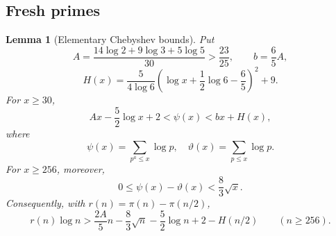 \documentclass[11pt]{article}
\numberwithin{equation}{section}
\newtheorem{lemma}[theorem]{Lemma}
\theoremstyle{definition}\newtheorem{definition}[theorem]{Definition}
\theoremstyle{remark}\newtheorem{remark}[theorem]{Remark}
\begin{document}
\subsection{Fresh primes}\label{arith:sec:elementary-primes}

\begin{lemma}[Elementary Chebyshev bounds]
\label{arith:lem:elementary-chebyshev}
Put
\[
 A=\frac{14\log2+9\log3+5\log5}{30}>\frac{23}{25},
 \qquad b=\frac65A,
\]
\[
 H(x)=\frac5{4\log6}
       \left(\log x+\frac12\log6-\frac65\right)^2+9.
\]
For $x\ge30$,
\[
 Ax-\frac52\log x+2<\psi(x)< bx+H(x),
\]
where
\[
 \psi(x)=\sum_{p^a\le x}\log p,\quad \vartheta(x)=\sum_{p\le x}\log p.
\]
For $x\ge256$, moreover,
\[
                  0\le\psi(x)-\vartheta(x)<\frac83\sqrt x.
\]
Consequently, with $r(n)=\pi(n)-\pi(n/2)$,
\[
 r(n)\log n>
 \frac{2A}{5}n-\frac83\sqrt n-\frac52\log n+2-H(n/2)
 \qquad(n\ge256).
\]
\end{lemma}
\end{document}

